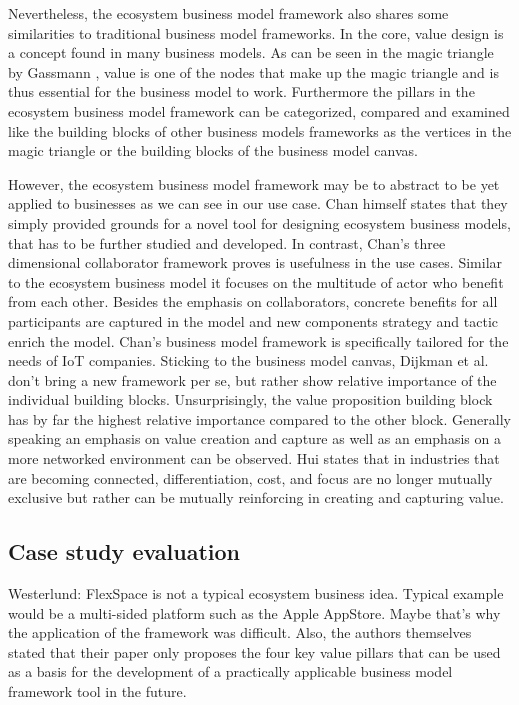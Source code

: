 	Nevertheless, the ecosystem business model framework also shares some similarities to traditional business model frameworks. In the core, value design is a concept found in many business models. As can be seen in the magic triangle by Gassmann \cite{gassmann55}, value is one of the nodes that make up the magic triangle and is thus essential for the business model to work. Furthermore the pillars in the ecosystem business model framework can be categorized, compared and examined like the building blocks of other business models frameworks as the vertices in the magic triangle or the building blocks of the business model canvas.

	However, the ecosystem business model framework may be to abstract to be yet applied to businesses as we can see in our use case. Chan himself states that they simply provided grounds for a novel tool for designing ecosystem business models, that has to be further studied and developed. In contrast, Chan's three dimensional collaborator framework proves is usefulness in the use cases. Similar to the ecosystem business model it focuses on the multitude of actor who benefit from each other. Besides the emphasis on collaborators, concrete benefits for all participants are captured in the model and new components strategy and tactic enrich the model. Chan's  business model framework is specifically tailored for the needs of IoT companies. Sticking to the business model canvas, Dijkman et al. \cite{dijkman} don't bring a new framework per se, but rather show relative importance of the individual building blocks. Unsurprisingly, the value proposition building block has by far the highest relative importance compared to the other block. Generally speaking an emphasis on value creation and capture as well as an emphasis on a more networked environment can be observed. Hui \cite{hui} states that in industries that are becoming connected, differentiation, cost, and focus are no longer mutually exclusive but rather can be mutually reinforcing in creating and capturing value.
	\subsection{Case study evaluation}

	Westerlund: FlexSpace is not a typical ecosystem business idea. Typical example would be a multi-sided platform such as the Apple AppStore. Maybe that's why the application of the framework was difficult. Also, the authors themselves stated that their paper only proposes the four key value pillars that can be used as a basis for the development of a practically applicable business model framework tool in the future.

